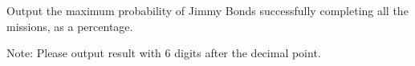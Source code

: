 Output the maximum probability of Jimmy Bonds successfully completing all the missions, as a percentage.

Note: Please output result with 6 digits after the decimal point.